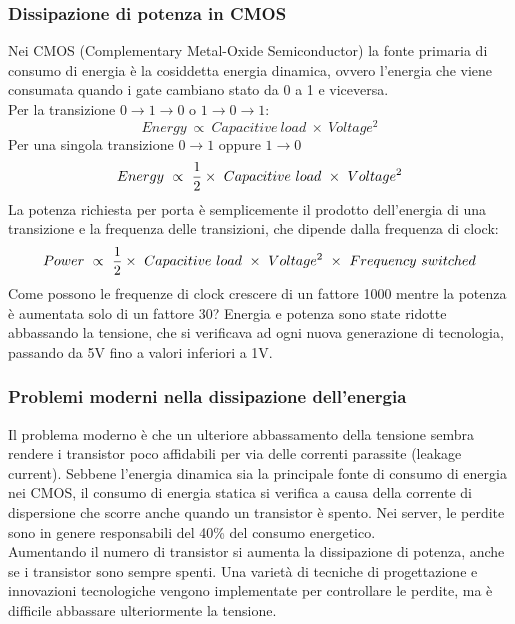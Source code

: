 \documentclass[12pt,a4paper]{article}
\begin{document}
\subsubsection{Dissipazione di potenza in CMOS}
Nei CMOS (Complementary Metal-Oxide Semiconductor) la fonte primaria di consumo di energia è la cosiddetta energia dinamica, ovvero l'energia che viene consumata quando i gate cambiano stato da 0 a 1 e viceversa.\\
Per la transizione $0 \rightarrow 1 \rightarrow 0$ o $1 \rightarrow 0 \rightarrow 1$: $$Energy\ \propto\ Capacitive\ load \ \times \ Voltage^2$$
Per una singola transizione $0 \rightarrow 1$ oppure $1 \rightarrow 0$ $$Energy\ \propto\ {1\over2}\times \ Capacitive\ load \ \times \ Voltage^2$$
La potenza richiesta per porta è semplicemente il prodotto dell'energia di una transizione e la frequenza delle transizioni, che dipende dalla frequenza di clock:
$$Power\ \propto\ {1\over2}\times \ Capacitive\ load \ \times \ Voltage^2 \ \times\ Frequency\ switched$$
Come possono le frequenze di clock crescere di un fattore 1000 mentre la potenza è aumentata solo di un fattore 30?
Energia e potenza sono state ridotte abbassando la tensione, che si verificava ad ogni nuova generazione di tecnologia, passando da 5V fino a valori inferiori a 1V.

\subsubsection{Problemi moderni nella dissipazione dell'energia}
Il problema moderno è che un ulteriore abbassamento della tensione sembra rendere i transistor poco affidabili per via delle correnti parassite (leakage current). Sebbene l'energia dinamica sia la principale fonte di consumo di energia nei CMOS, il consumo di energia statica si verifica a causa della corrente di dispersione che scorre anche quando un transistor è spento. Nei server, le perdite sono in genere responsabili del 40\% del consumo energetico.\\
Aumentando il numero di transistor si aumenta la dissipazione di potenza, anche se i transistor sono sempre spenti. Una varietà di tecniche di progettazione e innovazioni tecnologiche vengono implementate per controllare le perdite, ma
è difficile abbassare ulteriormente la tensione.
\end{document}
